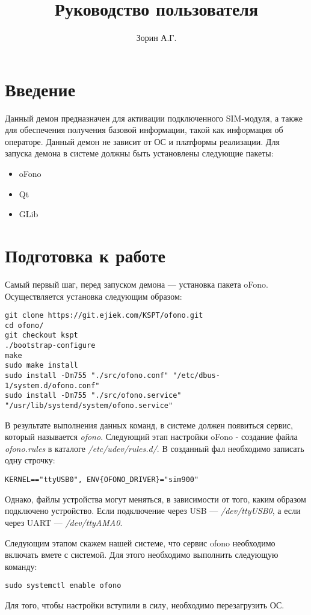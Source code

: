 \documentclass[14pt,a4paper]{report}
\author{Зорин А.Г.}
\title{Руководство пользователя}
\begin{document}
\maketitle
\renewcommand{\thesection}{\arabic{section}}
\section{Введение}
Данный демон предназначен для активации подключенного SIM-модуля, а также для обеспечения получения базовой информации, такой как информация об операторе. Данный демон не зависит от ОС и платформы реализации. Для запуска демона в системе должны быть установлены следующие пакеты:
\begin{itemize}
\item oFono
\item Qt
\item GLib
\end{itemize}
	
\section{Подготовка к работе}
Самый первый шаг, перед запуском демона --- установка пакета oFono. Осуществляется установка следующим образом:
\begin{verbatim}
git clone https://git.ejiek.com/KSPT/ofono.git
cd ofono/
git checkout kspt
./bootstrap-configure
make
sudo make install
sudo install -Dm755 "./src/ofono.conf" "/etc/dbus-1/system.d/ofono.conf"
sudo install -Dm755 "./src/ofono.service" "/usr/lib/systemd/system/ofono.service"
\end{verbatim}

В результате выполнения данных команд, в системе должен появиться сервис, который называется \textit{ofono}. Следующий этап настройки oFono - создание файла \textit{ofono.rules} в каталоге \textit{/etc/udev/rules.d/}. В созданный фал необходимо записать одну строчку:
\begin{verbatim}
KERNEL=="ttyUSB0", ENV{OFONO_DRIVER}="sim900"
\end{verbatim}

Однако, файлы устройства могут меняться, в зависимости от того, каким образом подключено устройство. Если подключение через USB --- \textit{/dev/ttyUSB0}, а если через UART --- \textit{/dev/ttyAMA0}.

Следующим этапом скажем нашей системе, что сервис ofono необходимо включать вмете с системой. Для этого необходимо выполнить следующую команду:
\begin{verbatim}
sudo systemctl enable ofono
\end{verbatim}
Для того, чтобы настройки вступили в силу, необходимо перезагрузить ОС. 
\end{document}
